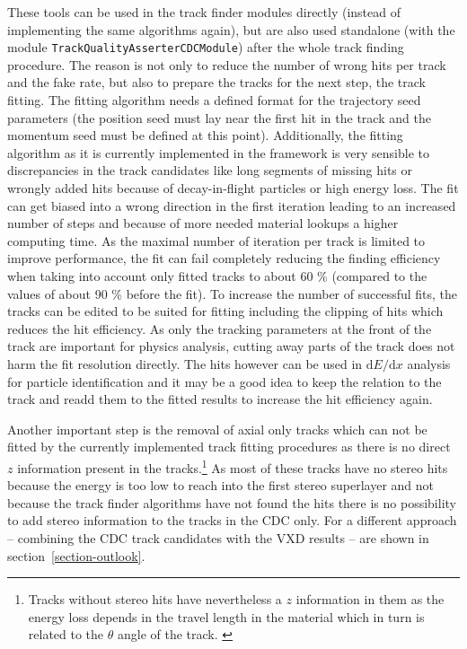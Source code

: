 These tools can be used in the track finder modules directly (instead of implementing the same algorithms again), but are also used standalone (with the module \texttt{Track\-Quality\-Asserter\-CDC\-Module}) after the whole track finding procedure. The reason is not only to reduce the number of wrong hits per track and the fake rate, but also to prepare the tracks for the next step, the track fitting. The fitting algorithm needs a defined format for the trajectory seed parameters (the position seed must lay near the first hit in the track and the momentum seed must be defined at this point). Additionally, the fitting algorithm as it is currently implemented in the framework is very sensible to discrepancies in the track candidates like long segments of missing hits or wrongly added hits because of decay-in-flight particles or high energy loss. The fit can get biased into a wrong direction in the first iteration leading to an increased number of steps and because of more needed material lookups a higher computing time. As the maximal number of iteration per track is limited to improve performance, the fit can fail completely reducing the finding efficiency when taking into account only fitted tracks to about 60 \% (compared to the values of about 90 \% before the fit). To increase the number of successful fits, the tracks can be edited to be suited for fitting including the clipping of hits which reduces the hit efficiency. As only the tracking parameters at the front of the track are important for physics analysis, cutting away parts of the track does not harm the fit resolution directly. The hits however can be used in $\mathrm d E/\mathrm d x$ analysis for particle identification and it may be a good idea to keep the relation to the track and readd them to the fitted results to increase the hit efficiency again. 

Another important step is the removal of axial only tracks which can not be fitted by the currently implemented track fitting procedures as there is no direct $z$ information present in the tracks.\footnote{Tracks without stereo hits have nevertheless a $z$ information in them as the energy loss depends in the travel length in the material which in turn is related to the $\theta$ angle of the track. \cite{martin}} As most of these tracks have no stereo hits because the energy is too low to reach into the first stereo superlayer and not because the track finder algorithms have not found the hits there is no possibility to add stereo information to the tracks in the CDC only. For a different approach -- combining the CDC track candidates with the VXD results -- are shown in section~\ref{section-outlook}.


